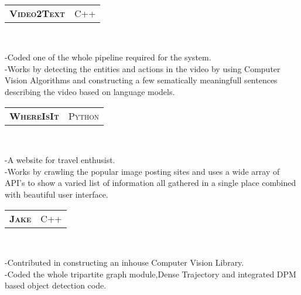 \documentclass[10pt,a4paper,oneside]{article}
\begin{document}
\begin{minipage}[t]{0.63\textwidth}
        \vspace{10pt}\\
        \begin{tabular}{c|c}
            \textbf{\normalsize V\textsc{ideo}2T\textsc{ext}}
            &\textmd{\normalsize C\textsc{++}}
        \end{tabular}\\
         \vspace{-4mm}
        \begin{adjustwidth}{7pt}{0pt}
        {\footnotesize -Coded one of the whole pipeline required
        for the system.\\
        -Works by detecting the entities and actions in the
        video by using Computer Vision Algorithms and constructing a few
        sematically meaningfull sentences describing the video
        based on language models.}\\
        \end{adjustwidth}
        \begin{tabular}{c|c}
            \textbf{\normalsize W\textsc{here}I\textsc{s}I\textsc{t}}
            &\textmd{\normalsize P\textsc{ython}}
        \end{tabular}\\
         \vspace{-4mm}
        \begin{adjustwidth}{7pt}{0pt}
        {\footnotesize -A website for travel
        enthusist.\\
        -Works by crawling the popular image posting sites and
        uses a wide array of API's to show a varied list of
        information all gathered in a single place combined with
        beautiful user interface. }\\
        \end{adjustwidth}
        \begin{tabular}{c|c}
            \textbf{\normalsize J\textsc{ake}}
            &\textmd{\normalsize C\textsc{++}}
        \end{tabular}\\
         \vspace{-4mm}
        \begin{adjustwidth}{7pt}{0pt}
        {\footnotesize -Contributed in constructing an inhouse
        Computer Vision Library.\\
        -Coded the whole tripartite graph module,Dense
    Trajectory and integrated DPM based object detection code.}\\
        \end{adjustwidth}

\end{minipage}
\end{document}
